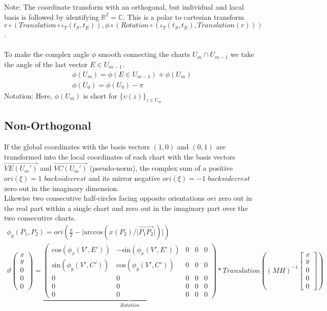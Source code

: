 \documentclass{report}
\begin{document}
Note: The coordinate transform with an orthogonal, but individual and local basis is followed by identifying $\mathbb{R}^2=\mathbb{C}$. This is a polar to cartesian transform $r\circ (Translation\circ \iota_{T}(t_{S},t_{E})),\phi \circ (Rotation\circ (\iota_{T}(t_{S},t_{E}),Translation(r)))$.\\\\
To make the complex angle $\phi$ smooth connecting the charts $U_{m}\cap U_{m-1}$ we take the angle of the last vector $E\in U_{m-1}$.
\begin{align}
\phi (U_{m}) = \phi (E \in U_{m-1})+\phi(U_{m})\\
\phi (U_{0})=\phi(U_{0}) -\pi
\end{align}
Notation: Here, $\phi (U_{m})$ is short for $\{\upsilon (z) \}_{z \in U_{m}}$
\subsection{Non-Orthogonal}
If the global coordinates with the basis vectors $(1,0)$ and $(0,1)$ are transformed into the local coordinates of each chart with the basis vectors $\overrightarrow{VE(U_{m}')}$ and $\overrightarrow{VC(U_{m}')}$ (pseudo-norm), the complex sum of a positive $ori(\xi)=1$ $backsidecrest$ and its mirror negative $ori(\xi)=-1$ $backsidecrest$ zero out in the imaginary dimension.\\
Likewise two consecutive half-circles facing opposite orientations $ori$ zero out in the real part within a single chart and zero out in the imaginary part over the two consecutive charts.
\begin{align}
\phi_{y}(P_{1},P_{2}) = ori(\frac{\pi}{2}-\lvert \mathrm{arccos}(x(P_{2})/\lvert \overrightarrow{P_{1}P_{2}}\rvert)\rvert)\\
\vartheta
\begin{pmatrix}x \\ y \\ 0 \\ 0 \\ 0\end{pmatrix}=
\underbrace{
\begin{pmatrix}
\mathrm{cos}(\phi_{x}(V',E')) & -\mathrm{sin}(\phi_{x}(V',E')) & 0 & 0 & 0 \\
\mathrm{sin}(\phi_{y}(V',C')) & \mathrm{cos}(\phi_{y}(V',C')) & 0 & 0 & 0 \\
0 & 0 & 0 & 0 & 0 \\
0 & 0 & 0 & 0 & 0 \\
0 & 0 & 0 & 0 & 0
\end{pmatrix}
}_{Rotation}*
Translation((MH)^{-1}\begin{bmatrix} x \\ y \\ 0 \\ 0 \\ 0 \end{bmatrix})
\end{align}
\end{document}
